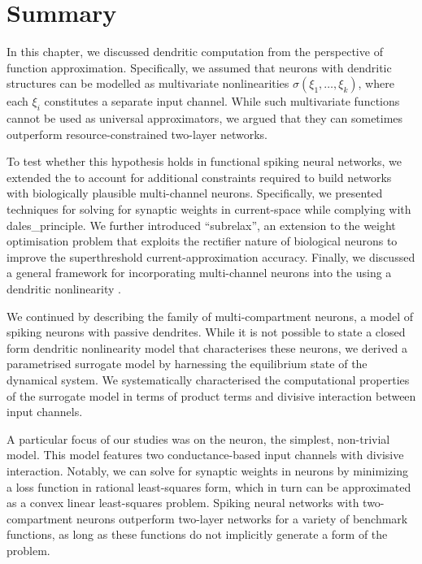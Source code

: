 
\section{Summary}
\label{sec:nlif_discussion}

In this chapter, we discussed dendritic computation from the perspective of function approximation.
Specifically, we assumed that neurons with dendritic structures can be modelled as multivariate nonlinearities $\sigma(\xi_1, \ldots, \xi_k)$, where each $\xi_i$ constitutes a separate input channel.
While such multivariate functions cannot be used as universal approximators, we argued that they can sometimes outperform resource-constrained two-layer networks.

To test whether this hypothesis holds in functional spiking neural networks, we extended the  to account for additional constraints required to build networks with biologically plausible multi-channel neurons.
Specifically, we presented techniques for solving for synaptic weights in current-space while complying with \gls{dales_principle}.
We further introduced \enquote{\gls{subrelax}}, an extension to the weight optimisation problem that exploits the rectifier nature of biological neurons to improve the superthreshold current-approximation accuracy.
Finally, we discussed a general framework for incorporating multi-channel neurons into the \NEF using a dendritic nonlinearity \Hden.

We continued by describing the \nlif family of multi-compartment neurons, a model of spiking neurons with passive dendrites.
While it is not possible to state a closed form dendritic nonlinearity model \Hden that characterises these neurons, we derived a parametrised surrogate model by harnessing the equilibrium state of the \nlif dynamical system.
We systematically characterised the computational properties of the surrogate model in terms of product terms and divisive interaction between input channels.

A particular focus of our studies was on the \twocomplif neuron, the simplest, non-trivial \nlif model.
This model features two conductance-based input channels with divisive interaction.
Notably, we can solve for synaptic weights in \twocomplif neurons by minimizing a loss function in rational least-squares form, which in turn can be approximated as a convex linear least-squares problem.
Spiking neural networks with two-compartment neurons outperform two-layer networks for a variety of benchmark functions, as long as these functions do not implicitly generate a form of the \XOR problem.


